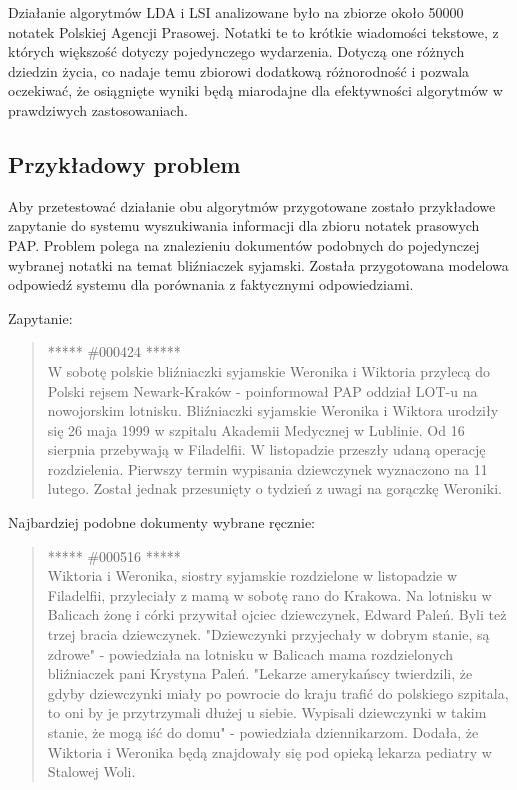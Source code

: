 \documentclass[11pt,a4paper]{article}
\begin{document}
Działanie algorytmów LDA i LSI analizowane było na zbiorze około 50000 notatek
Polskiej Agencji Prasowej. Notatki te to krótkie wiadomości tekstowe, z których
większość dotyczy pojedynczego wydarzenia. Dotyczą one różnych dziedzin życia,
co nadaje temu zbiorowi dodatkową różnorodność i pozwala oczekiwać, że
osiągnięte wyniki będą miarodajne dla efektywności algorytmów w prawdziwych
zastosowaniach.

\subsection{Przykładowy problem}
\label{sec:example}

Aby przetestować działanie obu algorytmów przygotowane zostało przykładowe
zapytanie do systemu wyszukiwania informacji dla zbioru notatek prasowych PAP.
Problem polega na znalezieniu dokumentów podobnych do pojedynczej wybranej
notatki na temat bliźniaczek syjamski. Została przygotowana modelowa odpowiedź
systemu dla porównania z faktycznymi odpowiedziami.

Zapytanie:

\begin{quote} ***** \#000424 *****\\ W sobotę polskie bliźniaczki syjamskie
Weronika i Wiktoria przylecą do Polski rejsem Newark-Kraków - poinformował PAP
oddział LOT-u na nowojorskim lotnisku.  Bliźniaczki syjamskie Weronika i
Wiktora urodziły się 26 maja 1999 w szpitalu Akademii Medycznej w Lublinie. Od
16 sierpnia przebywają w Filadelfii. W listopadzie przeszły udaną operację
rozdzielenia. Pierwszy termin wypisania dziewczynek wyznaczono na 11 lutego.
Został jednak przesunięty o tydzień z uwagi na gorączkę Weroniki.  \end{quote}

Najbardziej podobne dokumenty wybrane ręcznie:

\begin{quote} ***** \#000516 *****\\ Wiktoria i Weronika, siostry syjamskie
rozdzielone w listopadzie w Filadelfii, przyleciały z mamą w sobotę rano do
Krakowa. Na lotnisku w Balicach żonę i córki przywitał ojciec dziewczynek,
Edward Paleń. Byli też trzej bracia dziewczynek.  "Dziewczynki przyjechały w
dobrym stanie, są zdrowe" - powiedziała na lotnisku w Balicach mama
rozdzielonych bliźniaczek pani Krystyna Paleń. "Lekarze amerykańscy twierdzili,
że gdyby dziewczynki miały po powrocie do kraju trafić do polskiego szpitala,
to oni by je przytrzymali dłużej u siebie. Wypisali dziewczynki w takim stanie,
że mogą iść do domu" - powiedziała dziennikarzom. Dodała, że Wiktoria i
Weronika będą znajdowały się pod opieką lekarza pediatry w Stalowej Woli.
\end{quote}
\end{document}
